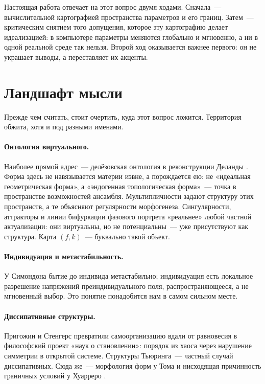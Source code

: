 \documentclass[11pt]{article}
\begin{document}
Настоящая работа отвечает на этот вопрос двумя ходами. Сначала~— вычислительной картографией пространства
параметров и его границ. Затем~— критическим снятием того допущения, которое эту картографию делает
идеализацией: в компьютере параметры меняются глобально и мгновенно, а ни в одной реальной среде так нельзя.
Второй ход оказывается важнее первого: он не украшает выводы, а переставляет их акценты.

\section{Ландшафт мысли}
Прежде чем считать, стоит очертить, куда этот вопрос ложится. Территория обжита, хотя и под разными именами.

\paragraph{Онтология виртуального.} Наиболее прямой адрес~— делёзовская онтология в реконструкции Деланды
\cite{delanda2002,deleuze1968}. Форма здесь не навязывается материи извне, а порождается ею: не «идеальная
геометрическая форма», а «эндогенная топологическая форма»~— точка в пространстве возможностей ансамбля.
Мультипличности задают структуру этих пространств, а те объясняют регулярности морфогенеза. Сингулярности,
аттракторы и линии бифуркации фазового портрета «реальнее» любой частной актуализации: они виртуальны, но
не потенциальны~— уже присутствуют как структура. Карта $(f,k)$~— буквально такой объект.

\paragraph{Индивидуация и метастабильность.} У Симондона \cite{simondon2005} бытие до индивида метастабильно;
индивидуация есть локальное разрешение напряжений преиндивидуального поля, распространяющееся, а не мгновенный
выбор. Это понятие понадобится нам в самом сильном месте.

\paragraph{Диссипативные структуры.} Пригожин и Стенгерс \cite{prigogine1984} превратили самоорганизацию вдали
от равновесия в философский проект «наук о становлении»: порядок из хаоса через нарушение симметрии в открытой
системе. Структуры Тьюринга~— частный случай диссипативных. Сюда же~— морфология форм у Тома \cite{thom1972} и
нисходящая причинность граничных условий у Хуарреро \cite{juarrero1999}.
\end{document}
